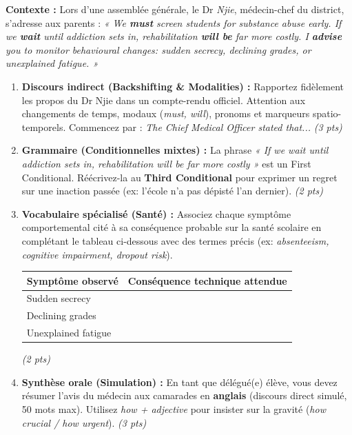 \documentclass[11pt]{article}
\begin{document}
\begin{exercice}
\textbf{Contexte :} Lors d'une assemblée générale, le Dr \textit{Njie}, médecin-chef du district, s'adresse aux parents : \textit{« We \textbf{must} screen students for substance abuse early. If we \textbf{wait} until addiction sets in, rehabilitation \textbf{will be} far more costly. I \textbf{advise} you to monitor behavioural changes: sudden secrecy, declining grades, or unexplained fatigue. »}

\begin{enumerate}
    \item \textbf{Discours indirect (Backshifting \& Modalities) :} Rapportez fidèlement les propos du Dr Njie dans un compte-rendu officiel. Attention aux changements de temps, modaux (\textit{must, will}), pronoms et marqueurs spatio-temporels. Commencez par : \textit{The Chief Medical Officer stated that...} \textit{(3 pts)}
    \item \textbf{Grammaire (Conditionnelles mixtes) :} La phrase \textit{« If we wait until addiction sets in, rehabilitation will be far more costly »} est un First Conditional. Réécrivez-la au \textbf{Third Conditional} pour exprimer un regret sur une inaction passée (ex: l'école n'a pas dépisté l'an dernier). \textit{(2 pts)}
    \item \textbf{Vocabulaire spécialisé (Santé) :} Associez chaque symptôme comportemental cité à sa conséquence probable sur la santé scolaire en complétant le tableau ci-dessous avec des termes précis (ex: \textit{absenteeism, cognitive impairment, dropout risk}).
    \begin{center}
    \begin{tabular}{|l|p{6cm}|}
    \hline
    \textbf{Symptôme observé} & \textbf{Conséquence technique attendue} \\
    \hline
    Sudden secrecy & \\
    \hline
    Declining grades & \\
    \hline
    Unexplained fatigue & \\
    \hline
    \end{tabular}
    \end{center}
    \textit{(2 pts)}
    \item \textbf{Synthèse orale (Simulation) :} En tant que délégué(e) élève, vous devez résumer l'avis du médecin aux camarades en \textbf{anglais} (discours direct simulé, 50 mots max). Utilisez \textit{how + adjective} pour insister sur la gravité (\textit{how crucial / how urgent}). \textit{(3 pts)}
\end{enumerate}
\end{exercice}
\end{document}
